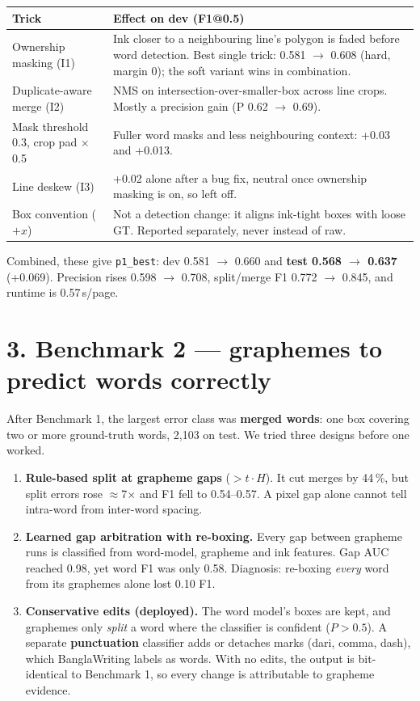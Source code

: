 \documentclass[10.5pt,a4paper]{article}
\begin{document}
\begin{center}\small
\begin{tabular}{p{5.1cm}p{9.6cm}}
\toprule
Trick & Effect on dev (F1@0.5)\\
\midrule
Ownership masking (I1) & Ink closer to a neighbouring line's polygon is faded before word
detection. Best single trick: 0.581 $\rightarrow$ 0.608 (hard, margin 0); the soft variant wins in combination. \\
Duplicate-aware merge (I2) & NMS on intersection-over-smaller-box across line crops. Mostly a
precision gain (P 0.62 $\rightarrow$ 0.69). \\
Mask threshold 0.3, crop pad $\times$0.5 & Fuller word masks and less neighbouring context: +0.03 and
+0.013. \\
Line deskew (I3) & +0.02 alone after a bug fix, neutral once ownership masking is on, so left off. \\
Box convention ($+x$) & Not a detection change: it aligns ink-tight boxes with loose GT. Reported
separately, never instead of raw. \\
\bottomrule
\end{tabular}
\end{center}

Combined, these give \texttt{p1\_best}: dev 0.581 $\rightarrow$ 0.660 and \textbf{test 0.568
$\rightarrow$ 0.637} (+0.069). Precision rises 0.598 $\rightarrow$ 0.708, split/merge F1 0.772
$\rightarrow$ 0.845, and runtime is 0.57\,s/page.

\section*{3. Benchmark 2 --- graphemes to predict words correctly}
After Benchmark 1, the largest error class was \textbf{merged words}: one box covering two or more
ground-truth words, 2{,}103 on test. We tried three designs before one worked.

\begin{enumerate}
  \item \textbf{Rule-based split at grapheme gaps} ($>t\cdot H$). It cut merges by 44\,\%, but
        split errors rose $\approx$7$\times$ and F1 fell to 0.54--0.57. A pixel gap alone cannot tell
        intra-word from inter-word spacing.
  \item \textbf{Learned gap arbitration with re-boxing.} Every gap between grapheme runs is
        classified from word-model, grapheme and ink features. Gap AUC reached 0.98, yet word F1
        was only 0.58. Diagnosis: re-boxing \emph{every} word from its graphemes alone lost 0.10 F1.
  \item \textbf{Conservative edits (deployed).} The word model's boxes are kept, and graphemes only
        \emph{split} a word where the classifier is confident ($P>0.5$). A separate
        \textbf{punctuation} classifier adds or detaches marks (dari, comma, dash), which BanglaWriting labels as words. With no edits, the output is bit-identical to
        Benchmark 1, so every change is attributable to grapheme evidence.
\end{enumerate}
\end{document}
